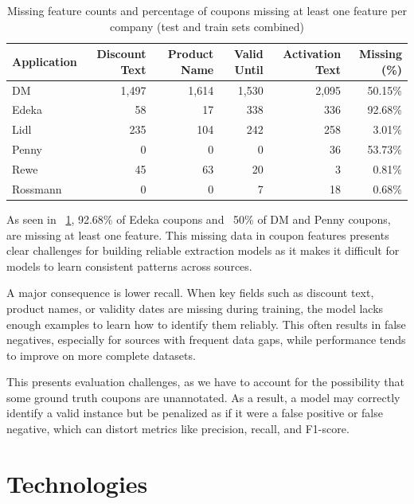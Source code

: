 \documentclass[licencjacka,en]{pracamgr}
\begin{document}
\begin{table}[h!]
\raggedright
\setlength{\tabcolsep}{4pt} 
\small 
\begin{tabular}{|l|r|r|r|r|r|}
\hline
\textbf{Application} & \textbf{Discount Text} & \textbf{Product Name} & \textbf{Valid Until} & \textbf{Activation Text} & \textbf{Missing (\%)} \\
\hline
DM        & 1,497 & 1,614 & 1,530 & 2,095 & 50.15\% \\
Edeka     & 58    & 17    & 338   & 336   & 92.68\% \\
Lidl      & 235   & 104   & 242   & 258   & 3.01\% \\
Penny     & 0     & 0     & 0     & 36    & 53.73\% \\
Rewe      & 45    & 63    & 20    & 3     & 0.81\% \\
Rossmann  & 0     & 0     & 7     & 18    & 0.68\% \\
\hline
\end{tabular}
\caption{Missing feature counts and percentage of coupons missing at least one feature per company (test and train sets combined)}
\label{tab:missing_coupons}
\end{table}

As seen in ~\ref{tab:missing_coupons}, 92.68\% of Edeka coupons and ~50\% of DM and Penny coupons, are missing at least one feature. This missing data in coupon features presents clear challenges for building reliable extraction models as it makes it difficult for models to learn consistent patterns across sources.

A major consequence is lower recall. When key fields such as discount text, product names, or validity dates are missing during training, the model lacks enough examples to learn how to identify them reliably. This often results in false negatives, especially for sources with frequent data gaps, while performance tends to improve on more complete datasets.

This presents evaluation challenges, as we have to account for the possibility that some ground truth coupons are unannotated. As a result, a model may correctly identify a valid instance but be penalized as if it were a false positive or false negative, which can distort metrics like precision, recall, and F1-score.

\chapter{Technologies} \label{chap:technologies}
\end{document}

